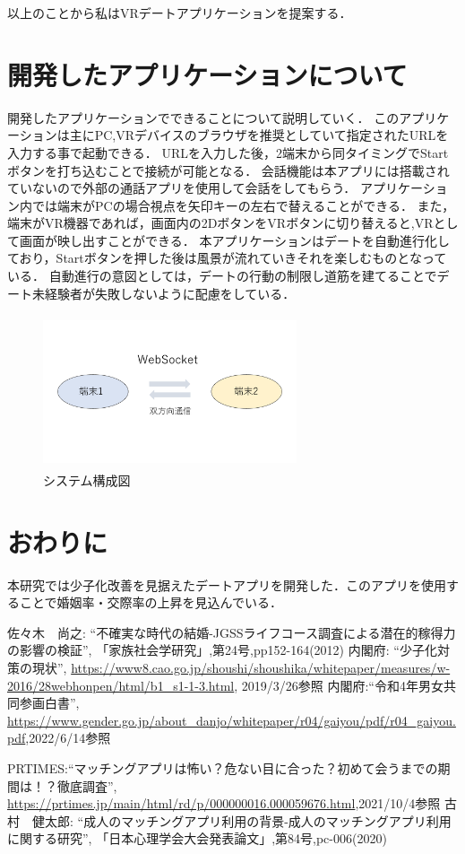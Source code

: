 \documentclass[twocolumn,10pt,a4j]{ltjsarticle}
\begin{document}
以上のことから私はVRデートアプリケーションを提案する．


\section{開発したアプリケーションについて}
開発したアプリケーションでできることについて説明していく．
このアプリケーションは主にPC,VRデバイスのブラウザを推奨としていて指定されたURLを入力する事で起動できる．
URLを入力した後，2端末から同タイミングでStartボタンを打ち込むことで接続が可能となる．
会話機能は本アプリには搭載されていないので外部の通話アプリを使用して会話をしてもらう．
アプリケーション内では端末がPCの場合視点を矢印キーの左右で替えることができる．
また，端末がVR機器であれば，画面内の2DボタンをVRボタンに切り替えると,VRとして画面が映し出すことができる．
本アプリケーションはデートを自動進行化しており，Startボタンを押した後は風景が流れていきそれを楽しむものとなっている．
自動進行の意図としては，デートの行動の制限し道筋を建てることでデート未経験者が失敗しないように配慮をしている．

\begin{figure}[h]
\begin{center}
\includegraphics[clip,width=75mm,height=45mm]{kougaisiryou.pdf}
\end{center}
 \caption{システム構成図}
\end{figure}

\section{おわりに}
本研究では少子化改善を見据えたデートアプリを開発した．このアプリを使用することで婚姻率・交際率の上昇を見込んでいる．

\begin{thebibliography}{99}
 佐々木　尚之: ``不確実な時代の結婚-JGSSライフコース調査による潜在的稼得力の影響の検証'', 「家族社会学研究」,第24号,pp152-164(2012)
 内閣府: ``少子化対策の現状'', \url{https://www8.cao.go.jp/shoushi/shoushika/whitepaper/measures/w-2016/28webhonpen/html/b1_s1-1-3.html}, 2019/3/26参照
内閣府:``令和4年男女共同参画白書'',
\url{https://www.gender.go.jp/about_danjo/whitepaper/r04/gaiyou/pdf/r04_gaiyou.pdf},2022/6/14参照


PRTIMES:``マッチングアプリは怖い？危ない目に合った？初めて会うまでの期間は！？徹底調査'',
\url{https://prtimes.jp/main/html/rd/p/000000016.000059676.html},2021/10/4参照
 古村　健太郎: ``成人のマッチングアプリ利用の背景-成人のマッチングアプリ利用に関する研究'', 「日本心理学会大会発表論文」,第84号,pc-006(2020)

\end{thebibliography}
\end{document}
